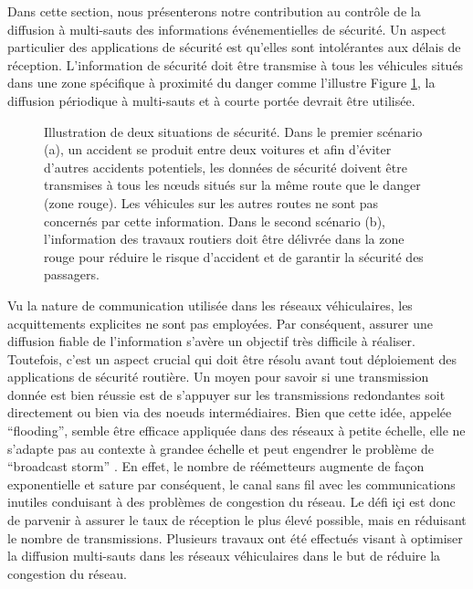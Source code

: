 Dans cette section, nous présenterons notre contribution au contrôle de la diffusion à multi-sauts des informations événementielles de sécurité.
Un aspect particulier des applications de sécurité est qu'elles sont intolérantes aux délais de réception. L'information de sécurité doit être transmise à tous les véhicules situés dans une zone spécifique à proximité du danger comme l'illustre Figure \ref{ch4:scenarios}, la diffusion périodique à multi-sauts et à courte portée devrait être utilisée.

\begin{figure}[!h]
\centering
{}
\caption[Illustration de deux situations de sécurité.] {Illustration de deux situations de sécurité. Dans le premier scénario (a), un accident se produit entre deux voitures et afin d'éviter d'autres accidents potentiels, les données de sécurité doivent être transmises à tous les nœuds situés sur la même route que le danger (zone rouge). Les véhicules sur les autres routes ne sont pas concernés par cette information. Dans le second scénario (b), l'information des travaux routiers doit être délivrée dans la zone rouge pour réduire le risque d'accident et de garantir la sécurité des passagers.}
\label{ch4:scenarios}
\end{figure}

Vu la nature de communication utilisée dans les réseaux véhiculaires, les acquittements explicites ne sont pas employées. Par conséquent, assurer une diffusion fiable de l'information s'avère un objectif très difficile à réaliser.
Toutefois, c'est un aspect crucial qui doit être résolu avant tout déploiement des applications de sécurité routière. Un moyen pour savoir si une transmission donnée est bien réussie est de s'appuyer sur les transmissions redondantes soit directement ou bien via des noeuds intermédiaires. Bien que cette idée, appelée ``flooding'', semble \^etre efficace appliquée dans des réseaux à petite échelle, elle ne s'adapte pas au contexte à grandee échelle et peut engendrer le problème de ``broadcast storm'' \cite{IEEEhowto:storm}. En effet, le nombre de réémetteurs augmente de façon exponentielle et sature par conséquent, le canal sans fil avec les communications inutiles conduisant à des problèmes de congestion du réseau. Le défi i\c{c}i est donc de parvenir à assurer le taux de réception le plus élevé possible, mais en réduisant le nombre de transmissions. Plusieurs travaux ont été effectués visant à optimiser la diffusion multi-sauts dans les réseaux véhiculaires dans le but de réduire la congestion du réseau.

